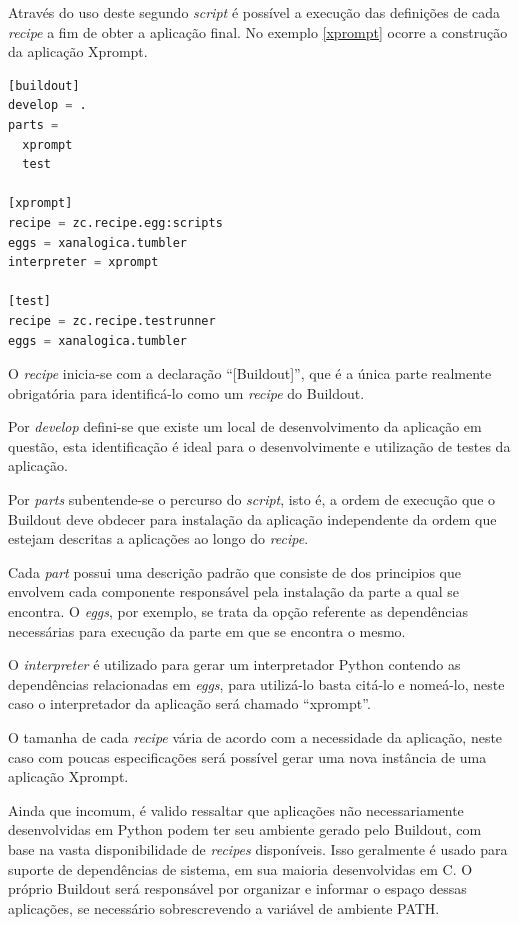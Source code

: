 Através do uso deste segundo \textit{script} é possível a execução das definições de cada \textit{recipe} a fim de obter a aplicação final. No exemplo \ref{xprompt} ocorre a construção da aplicação Xprompt.

{\singlespace
\begin{lstlisting}[caption=Exemplo de um \textit{script} Buildout,language=python,label={xprompt}]
[buildout]
develop = .
parts = 
  xprompt
  test

[xprompt]
recipe = zc.recipe.egg:scripts
eggs = xanalogica.tumbler
interpreter = xprompt

[test]
recipe = zc.recipe.testrunner
eggs = xanalogica.tumbler

\end{lstlisting}
}

O \textit{recipe} inicia-se com a declaração ``[Buildout]'', que é a única parte realmente obrigatória para identificá-lo como um \textit{recipe} do Buildout.

Por \textit{develop} defini-se que existe um local de desenvolvimento da aplicação em questão, esta identificação é ideal para o desenvolvimente e utilização de testes da aplicação.

Por \textit{parts} subentende-se o percurso do \textit{script}, isto é, a ordem de execução que o Buildout deve obdecer para instalação da aplicação independente da ordem que estejam descritas a aplicações ao longo do \textit{recipe}.

Cada \textit{part} possui uma descrição padrão que consiste de dos principios que envolvem cada componente responsável pela instalação da parte a qual se encontra. O \textit{eggs}, por exemplo, se trata da opção referente as dependências necessárias para execução da parte em que se encontra o mesmo.

O \textit{interpreter} é utilizado para gerar um interpretador Python contendo as dependências relacionadas em \textit{eggs}, para utilizá-lo basta citá-lo e nomeá-lo, neste caso o interpretador da aplicação será chamado ``xprompt''.

O tamanha de cada \textit{recipe} vária de acordo com a necessidade da aplicação, neste caso com poucas especificações será possível gerar uma nova instância de uma aplicação Xprompt.

Ainda que incomum, é valido ressaltar que aplicações não necessariamente desenvolvidas em Python podem ter seu ambiente gerado pelo Buildout, com base na vasta disponibilidade de \textit{recipes} disponíveis. Isso geralmente é usado para suporte de dependências de sistema, em sua maioria desenvolvidas em C. O próprio Buildout será responsável por organizar e informar o espaço dessas aplicações, se necessário sobrescrevendo a variável de ambiente PATH.

